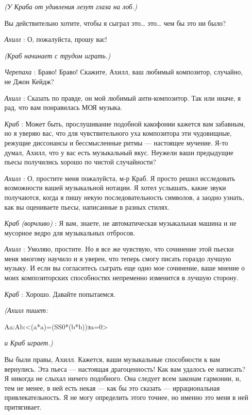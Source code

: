 \emph{(У Краба от удивления лезут глаза на лоб.)}

Вы действительно хотите, чтобы я сыграл это\ldots{} это\ldots{} чем бы это ни было?

\emph{Ахилл} : О, пожалуйста, прошу вас!

\emph{(Краб начинает с трудом играть.)}

\emph{Черепаха} : Браво! Браво! Скажите, Ахилл, ваш любимый композитор, случайно, не Джон Кейдж?

\emph{Ахилл} : Сказать по правде, он мой любимый анти-композитор. Так или иначе, я рад, что вам понравилась МОЯ музыка.

\emph{Краб} : Может быть, прослушивание подобной какофонии кажется вам забавным, но я уверяю вас, что для чувствительного уха композитора эти чудовищные, режущие диссонансы и бессмысленные ритмы --- настоящее мучение. Я-то думал, Ахилл, что у вас есть музыкальный вкус. Неужели ваши предыдущие пьесы получились хорошо по чистой случайности?

\emph{Ахилл} : О, простите меня пожалуйста, м-р Краб. Я просто решил исследовать возможности вашей музыкальной нотации. Я хотел услышать, какие звуки получаются, когда я пишу некую последовательность символов, а заодно узнать, как вы оцениваете пьесы, написанные в разных стилях.

\emph{Краб (ворчливо)} : Я вам, знаете, не автоматическая музыкальная машина и не мусорное ведро для музыкальных отбросов.

\emph{Ахилл} : Умоляю, простите. Но я все же чувствую, что сочинение этой пьески меня многому научило и я уверен, что теперь смогу писать гораздо лучшую музыку. И если вы согласитесь сыграть еще одно мое сочинение, ваше мнение о моих композиторских способностях непременно изменится в лучшую сторону.

\emph{Краб} : Хорошо. Давайте попытаемся.

\emph{(Ахилл пишет:}

Aa:Ab:\textless(a*a)=(SS0*(b*b))эa=0\textgreater{}

\emph{и Краб играет.)}

Вы были правы, Ахилл. Кажется, ваши музыкальные способности к вам вернулись. Эта пьеса --- настоящая драгоценность! Как вам удалось ее написать? Я никогда не слыхал ничего подобного. Она следует всем законам гармонии, и, тем не менее, в ней есть некая --- как бы это сказать --- иррациональная привлекательность. Я не могу определить этого точнее, но именно это меня в ней притягивает.

